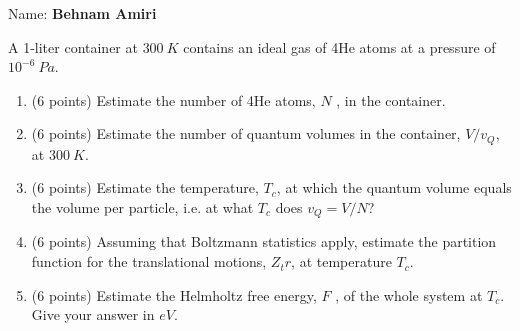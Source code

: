 \documentclass[fleqn]{article}
\begin{document}
  Name: \textbf{Behnam Amiri}

  \vspace{1cm}

  A 1-liter container at $300 ~ K$ contains an ideal gas of 4He atoms at a pressure of $10^{-6} ~ Pa$.
  \begin{enumerate}
    \item (6 points) Estimate the number of 4He atoms, $N$ , in the container.


    \item (6 points) Estimate the number of quantum volumes in the container, $V/v_Q$, at $300 ~ K$.


    \item (6 points) Estimate the temperature, $T_c$, at which the quantum volume equals the volume per
    particle, i.e. at what $T_c$ does $v_Q=V/N$?


    \item (6 points) Assuming that Boltzmann statistics apply, estimate the partition function for the
    translational motions, $Z_tr$, at temperature $T_c$.
  

    \item (6 points) Estimate the Helmholtz free energy, $F$ , of the whole system at $T_c$. Give your answer
    in $eV$.


  \end{enumerate}
\end{document}
